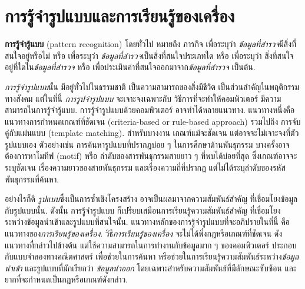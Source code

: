 \section{การรู้จำรูปแบบและการเรียนรู้ของเครื่อง}
\label{sec: intro ML}

\textbf{การรู้จำรู้แบบ} (pattern recognition) โดยทั่วไป หมายถึง
ภารกิจ เพื่อระบุว่า
\textit{ข้อมูลที่สำรวจ}มีสิ่งที่สนใจอยู่หรือไม่ 
หรือ
เพื่อระบุว่า
\textit{ข้อมูลที่สำรวจ}เป็นสิ่งที่สนใจประเภทใด
หรือ
เพื่อระบุว่า
สิ่งที่สนใจอยู่ที่ใดใน\textit{ข้อมูลที่สำรวจ}
หรือ
เพื่อประเมินค่าที่สนใจออกมาจาก\textit{ข้อมูลที่สำรวจ}
เป็นต้น.

\textit{การรู้จำรูปแบบ}นั้น
มีอยู่ทั่วไปในธรรมชาติ
เป็นความสามารถของสิ่งมีชีวิต
เป็นส่วนสำคัญในพฤติกรรมทางสังคม
แต่ในที่นี้
\textit{การรูปจำรูปแบบ}
จะเจาะจงเฉพาะกับ
วิธีการที่จะทำให้คอมพิวเตอร์
มีความสามารถในการรู้จำรู้แบบ.
%
การรู้จำรูปแบบด้วยคอมพิวเตอร์
อาจทำได้หลายแนวทาง.
%
แนวทางหนึ่งคือ
แนวทางการกำหนดเกณฑ์ที่ชัดเจน
(criteria-based or rule-based approach)
รวมไปถึง
การจับคู่กับแผ่นแบบ (template matching).
สำหรับบางงาน
เกณฑ์แม้จะชัดเจน 
แต่อาจจะไม่เจาะจงที่ตัวรูปแบบเอง
ตัวอย่างเช่น 
การค้นหารูปแบบที่ปรากฏบ่อย ๆ
%
ในการศึกษาด้านพันธุกรรม บางครั้งอาจต้องการหาโมทีฟ (motif) หรือ ลำดับของสารพันธุกรรมสายยาว ๆ ที่พบได้บ่อยที่สุด  ซึ่งเกณฑ์อาจจะระบุชัดเจน เรื่องความยาวของสายพันธุกรรม และเรื่องความถี่ที่ปรากฏ แต่ไม่ได้ระบุลำดับของรหัสพันธุกรรมที่ค้นหา.

อย่างไรก็ดี
\textit{รูปแบบ}ซึ่งเป็นการซ้ำเชิงโครงสร้าง
อาจเป็นผลมาจากความสัมพันธ์สำคัญ ที่เชื่อมโยงข้อมูลกับรูปแบบนั้น.
ดังนั้น
การรู้จำรูปแบบ 
ก็เปรียบเสมือนการเรียนรู้ความสัมพันธ์สำคัญ
ที่เชื่อมโยงระหว่างข้อมูลนำเข้าและรูปแบบที่สนใจนั้น.
%
แนวทางหลักของการรู้จำรูปแบบที่จะอภิปรายในที่นี้
คือ
แนวทางของ\textit{การเรียนรู้ของเครื่อง}.
%
วิธี\textit{การเรียนรู้ของเครื่อง} 
จะไม่ได้พึ่งกฎหรือเกณฑ์ที่ชัดเจน 
ดังแนวทางที่กล่าวไปข้างต้น
แต่ใช้ความสามารถในการทำงานกับข้อมูลมาก ๆ ของคอมพิวเตอร์ ประกอบกับแบบจำลองทางคณิตศาสตร์
เพื่อช่วยในการค้นหา 
หรือช่วยในการเรียนรู้ความสัมพันธ์ระหว่าง\textit{ข้อมูลนำเข้า} 
และรูปแบบที่มักเรียกว่า \textit{ข้อมูลนำออก} 
%
โดยเฉพาะสำหรับความสัมพันธ์ที่มีลักษณะซับซ้อน
และยากที่จะกำหนดเป็นกฎหรือเกณฑ์ดังกล่าว.

